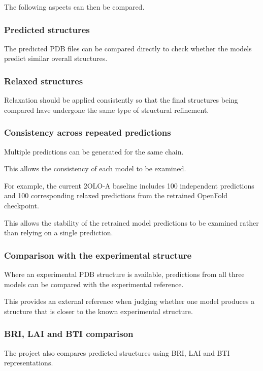 \documentclass[11pt,a4paper]{article}
\begin{document}
The following aspects can then be compared.


\subsubsection{Predicted structures}

The predicted PDB files can be compared directly to check whether the models predict similar overall structures.


\subsubsection{Relaxed structures}

Relaxation should be applied consistently so that the final structures being compared have undergone the same type of structural refinement.


\subsubsection{Consistency across repeated predictions}

Multiple predictions can be generated for the same chain.

This allows the consistency of each model to be examined.

For example, the current 2OLO-A baseline includes 100 independent predictions and 100 corresponding relaxed predictions from the retrained OpenFold checkpoint.

This allows the stability of the retrained model predictions to be examined rather than relying on a single prediction.


\subsubsection{Comparison with the experimental structure}

Where an experimental PDB structure is available, predictions from all three models can be compared with the experimental reference.

This provides an external reference when judging whether one model produces a structure that is closer to the known experimental structure.


\subsubsection{BRI, LAI and BTI comparison}

The project also compares predicted structures using BRI, LAI and BTI representations.
\end{document}
